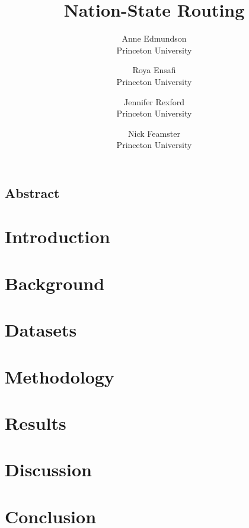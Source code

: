 \documentclass[letterpaper,twocolumn,10pt]{article}
\begin{document}
\date{}

\title{\Large \bf Nation-State Routing}

\author{
{\rm Anne Edmundson}\\
Princeton University
\and
{\rm Roya Ensafi}\\
Princeton University
\and
{\rm Jennifer Rexford}\\
Princeton University
\and
{\rm Nick Feamster}\\
Princeton University
} %

\maketitle

\thispagestyle{empty}

\subsection*{Abstract}


\section{Introduction}

\section{Background}

\section{Datasets}

\section{Methodology}

\section{Results} 

\section{Discussion}

\section{Conclusion}

{\footnotesize 
}

\end{document}
